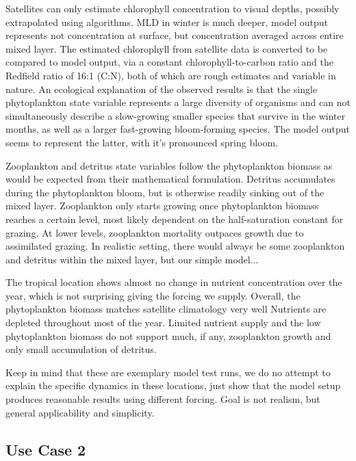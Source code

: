 \documentclass[template.tex]{subfiles}
\begin{document}
Satellites can only estimate chlorophyll concentration to visual depths, possibly extrapolated using algorithms. MLD in winter is much deeper, model output represents not concentration at surface, but concentration averaged across entire mixed layer.
The estimated chlorophyll from satellite data is converted to be compared to model output, via a constant chlorophyll-to-carbon ratio and the Redfield ratio of 16:1 (C:N), both of which are rough estimates and variable in nature. 
An ecological explanation of the observed results is that the single phytoplankton state variable represents a large diversity of organisms and can not simultaneously describe a slow-growing smaller species that survive in the winter months, as well as a larger fast-growing bloom-forming species. The model output seems to represent the latter, with it's pronounced spring bloom. 

Zooplankton and detritus state variables follow the phytoplankton biomass as would be expected from their mathematical formulation. Detritus accumulates during the phytoplankton bloom, but is otherwise readily sinking out of the mixed layer. Zooplankton only starts growing once phytoplankton biomass reaches a certain level, most likely dependent on the half-saturation constant for grazing. At lower levels, zooplankton mortality outpaces growth due to assimilated grazing. 
In realistic setting, there would always be some zooplankton and detritus within the mixed layer, but our simple model...

The tropical location shows almost no change in nutrient concentration over the year, which is not surprising giving the forcing we supply. 
Overall, the phytoplankton biomass matches satellite climatology very well 
Nutrients are depleted throughout most of the year.
Limited nutrient supply and the low phytoplankton biomass do not support much, if any, zooplankton growth and only small accumulation of detritus.

Keep in mind that these are exemplary model test runs, we do no attempt to explain the specific dynamics in these locations, just show that the model setup produces reasonable results using different forcing. Goal is not realism, but general applicability and simplicity. 





\subsection{Use Case 2}
\end{document}
